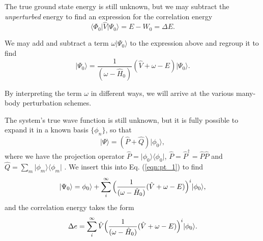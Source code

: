 The true ground state energy is still unknown, but we
may subtract the \emph{unperturbed} energy to find an expression for
the correlation energy
\begin{equation}
\langle \Phi_0 \vert \hat{V} \vert \Psi_0 \rangle = E - W_0 = \Delta E.
\end{equation}

We may add and subtract a term $\omega \vert \Psi_0 \rangle$ to the expression above and regroup it to find
\begin{equation}
\vert \Psi_0  \rangle = \frac{1}{(\omega - \hat{H}_0)} (\hat{V} + \omega - E) \vert \Psi_0 \rangle .
\label{eqn:pt_1}
\end{equation}

By interpreting the term $\omega$ in different ways, we will arrive at the various many-body perturbation schemes.

The system's true wave function is still unknown, but it is fully
possible to expand it in a known basis $\{\phi_n \}$, so that
\begin{equation}
\vert \Psi \rangle = (\hat{P} + \hat{Q})\vert \phi_0 \rangle,
\end{equation}
where we have the projection operator $\hat{P} = \vert \phi_0 \rangle \langle \phi_0 \vert$, $\hat{P} = \hat{P}^\dagger = \hat{P}\hat{P}$ and $\hat{Q} = \sum_{m} \vert \phi_m \rangle \langle \phi_m \vert$ \cite{ShavittBartlett2009}. 
We insert this into Eq. (\ref{eqn:pt_1}) to find
\begin{equation}
\vert \Psi_0  \rangle = \phi_0 \rangle + \sum_i^\infty \Big{(} \frac{1}{(\omega - \hat{H}_0)} (\hat{V} + \omega - E) \Big{)}^i \vert \phi_0 \rangle ,
\label{eqn:pt_2}
\end{equation}
and the correlation energy takes the form
\begin{equation}
\Delta e = \sum_i^\infty  \hat{V} \Big{(} \frac{1}{(\omega - \hat{H}_0)} (\hat{V} + \omega - E) \Big{)}^i \vert \phi_0 \rangle .
\label{eqn:pt_2}
\end{equation}

